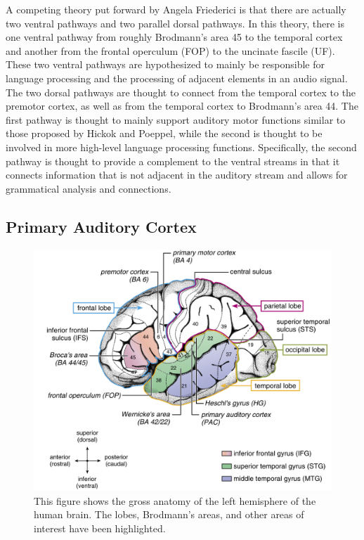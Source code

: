 \documentclass[titlepage]{article}
\begin{document}
  A competing theory put forward by Angela Friederici \cite{Friederici2011} is
  that there are actually two ventral pathways and two parallel dorsal pathways.
  In this theory, there is one ventral pathway from roughly Brodmann's area 45
  to the temporal cortex and another from the frontal operculum (FOP) to the
  uncinate fascile (UF). These two ventral pathways are hypothesized to mainly
  be responsible for language processing and the processing of adjacent elements
  in an audio signal. The two dorsal pathways are thought to connect from the
  temporal cortex to the premotor cortex, as well as from the temporal cortex
  to Brodmann's area 44. The first pathway is thought to mainly support
  auditory motor functions similar to those proposed by Hickok and Poeppel,
  while the second is thought to be involved in more high-level language
  processing functions. Specifically, the second pathway is thought to provide
  a complement to the ventral streams in that it connects information that
  is not adjacent in the auditory stream and allows for grammatical analysis
  and connections.

  \subsection{Primary Auditory Cortex} \label{primaryAuditoryCortex}

    \begin{figure}
      \centering
      \includegraphics[scale=0.25]{primaryAuditoryAnatomy}
      \caption{This figure shows the gross anatomy of the left hemisphere
      of the human brain. The lobes, Brodmann's areas, and other areas
      of interest have been highlighted. \cite{Friederici2011}}
      \label{primaryAuditoryAnatomy}
    \end{figure}
\end{document}
